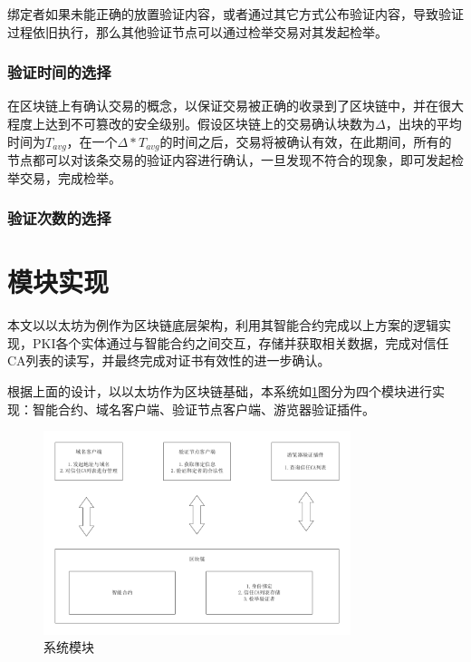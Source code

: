 绑定者如果未能正确的放置验证内容，或者通过其它方式公布验证内容，导致验证过程依旧执行，那么其他验证节点可以通过检举交易对其发起检举。


\subsubsection{验证时间的选择}

在区块链上有确认交易的概念，以保证交易被正确的收录到了区块链中，并在很大程度上达到不可篡改的安全级别\supercite{nakamoto2008bitcoin}。假设区块链上的交易确认块数为$\Delta$，出块的平均时间为$T_{avg}$，在一个$\Delta*T_{avg}$的时间之后，交易将被确认有效，在此期间，所有的节点都可以对该条交易的验证内容进行确认，一旦发现不符合的现象，即可发起检举交易，完成检举。

\subsubsection{验证次数的选择}




\section{模块实现}

本文以以太坊为例作为区块链底层架构，利用其智能合约完成以上方案的逻辑实现，PKI各个实体通过与智能合约之间交互，存储并获取相关数据，完成对信任CA列表的读写，并最终完成对证书有效性的进一步确认。

根据上面的设计，以以太坊作为区块链基础，本系统如\ref{fig:module}图分为四个模块进行实现：智能合约、域名客户端、验证节点客户端、游览器验证插件。

\begin{figure}[htbp]
 	\centering
 	\includegraphics[width = 0.8\textwidth]{img/module}
 	\caption{系统模块}\label{fig:module}
\end{figure}

